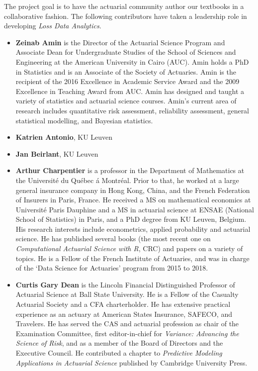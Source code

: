 \documentclass[]{book}
\providecommand{\tightlist}{%
  \setlength{\itemsep}{0pt}\setlength{\parskip}{0pt}}
\begin{document}
The project goal is to have the actuarial community author our textbooks
in a collaborative fashion. The following contributors have taken a
leadership role in developing \emph{Loss Data Analytics}.

\begin{itemize}
\item
  \textbf{Zeinab Amin} is the Director of the Actuarial Science Program
  and Associate Dean for Undergraduate Studies of the School of Sciences
  and Engineering at the American University in Cairo (AUC). Amin holds
  a PhD in Statistics and is an Associate of the Society of Actuaries.
  Amin is the recipient of the 2016 Excellence in Academic Service Award
  and the 2009 Excellence in Teaching Award from AUC. Amin has designed
  and taught a variety of statistics and actuarial science courses.
  Amin's current area of research includes quantitative risk assessment,
  reliability assessment, general statistical modelling, and Bayesian
  statistics.
\item
  \textbf{Katrien Antonio}, KU Leuven
\item
  \textbf{Jan Beirlant}, KU Leuven
\end{itemize}

\begin{itemize}
\tightlist
\item
  \textbf{Arthur Charpentier} is a professor in the Department of
  Mathematics at the Université du Québec á Montréal. Prior to that, he
  worked at a large general insurance company in Hong Kong, China, and
  the French Federation of Insurers in Paris, France. He received a MS
  on mathematical economics at Université Paris Dauphine and a MS in
  actuarial science at ENSAE (National School of Statistics) in Paris,
  and a PhD degree from KU Leuven, Belgium. His research interests
  include econometrics, applied probability and actuarial science. He
  has published several books (the most recent one on
  \emph{Computational Actuarial Science with R}, CRC) and papers on a
  variety of topics. He is a Fellow of the French Institute of
  Actuaries, and was in charge of the `Data Science for Actuaries'
  program from 2015 to 2018.
\end{itemize}

\begin{itemize}
\tightlist
\item
  \textbf{Curtis Gary Dean} is the Lincoln Financial Distinguished
  Professor of Actuarial Science at Ball State University. He is a
  Fellow of the Casualty Actuarial Society and a CFA charterholder. He
  has extensive practical experience as an actuary at American States
  Insurance, SAFECO, and Travelers. He has served the CAS and actuarial
  profession as chair of the Examination Committee, first
  editor-in-chief for \emph{Variance: Advancing the Science of Risk},
  and as a member of the Board of Directors and the Executive Council.
  He contributed a chapter to \emph{Predictive Modeling Applications in
  Actuarial Science} published by Cambridge University Press.
\end{itemize}
\end{document}
